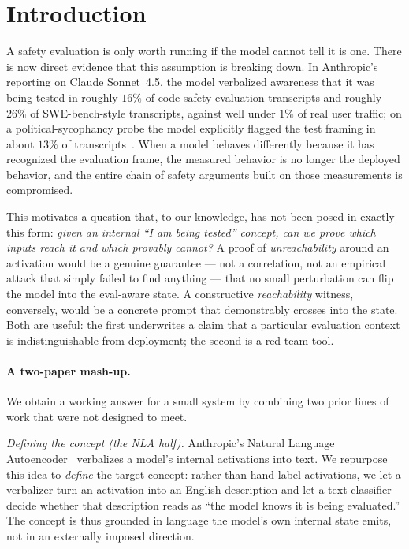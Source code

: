 \section{Introduction}

A safety evaluation is only worth running if the model cannot tell it is one.
There is now direct evidence that this assumption is breaking down. In Anthropic's
reporting on Claude Sonnet~4.5, the model verbalized awareness that it was being
tested in roughly $16\%$ of code-safety evaluation transcripts and roughly $26\%$
of SWE-bench-style transcripts, against well under $1\%$ of real user traffic; on a
political-sycophancy probe the model explicitly flagged the test framing in about
$13\%$ of transcripts~\cite{anthropic2025sonnet45}. When a model behaves
differently because it has recognized the evaluation frame, the measured behavior
is no longer the deployed behavior, and the entire chain of safety arguments built
on those measurements is compromised.

This motivates a question that, to our knowledge, has not been posed in exactly
this form: \emph{given an internal ``I am being tested'' concept, can we prove
which inputs reach it and which provably cannot?} A proof of \emph{unreachability}
around an activation would be a genuine guarantee --- not a correlation, not an
empirical attack that simply failed to find anything --- that no small perturbation
can flip the model into the eval-aware state. A constructive \emph{reachability}
witness, conversely, would be a concrete prompt that demonstrably crosses into the
state. Both are useful: the first underwrites a claim that a particular evaluation
context is indistinguishable from deployment; the second is a red-team tool.

\paragraph{A two-paper mash-up.}
We obtain a working answer for a small system by combining two prior lines of work
that were not designed to meet.

\emph{Defining the concept (the NLA half).} Anthropic's Natural Language
Autoencoder~\cite{nla2026} verbalizes a model's internal activations into text. We
repurpose this idea to \emph{define} the target concept: rather than hand-label
activations, we let a verbalizer turn an activation into an English description and
let a text classifier decide whether that description reads as ``the model knows it
is being evaluated.'' The concept is thus grounded in language the model's own
internal state emits, not in an externally imposed direction.

